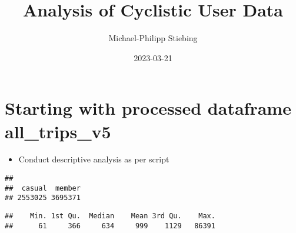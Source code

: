 \documentclass[
]{article}
\title{Analysis of Cyclistic User Data}
\author{Michael-Philipp Stiebing}
\date{2023-03-21}
\newenvironment{Shaded}{\begin{snugshade}}{\end{snugshade}}
\newcommand{\CommentTok}[1]{\textcolor[rgb]{0.56,0.35,0.01}{\textit{#1}}}
\newcommand{\FunctionTok}[1]{\textcolor[rgb]{0.00,0.00,0.00}{#1}}
\newcommand{\NormalTok}[1]{#1}
\newcommand{\OtherTok}[1]{\textcolor[rgb]{0.56,0.35,0.01}{#1}}
\newcommand{\SpecialCharTok}[1]{\textcolor[rgb]{0.00,0.00,0.00}{#1}}
\newcommand{\StringTok}[1]{\textcolor[rgb]{0.31,0.60,0.02}{#1}}
\providecommand{\tightlist}{%
  \setlength{\itemsep}{0pt}\setlength{\parskip}{0pt}}
\begin{document}
\maketitle

\fontsize{9}{11}
\selectfont

\fontsize{10}{12}
\selectfont

\hypertarget{starting-with-processed-dataframe-all_trips_v5}{%
\section{Starting with processed dataframe
all\_trips\_v5}\label{starting-with-processed-dataframe-all_trips_v5}}

\begin{itemize}
\tightlist
\item
  Conduct descriptive analysis as per script
\end{itemize}

\fontsize{9}{11}
\selectfont

\begin{Shaded}
\end{Shaded}

\begin{verbatim}
## 
##  casual  member 
## 2553025 3695371
\end{verbatim}

\begin{Shaded}
\end{Shaded}

\begin{verbatim}
##    Min. 1st Qu.  Median    Mean 3rd Qu.    Max. 
##      61     366     634     999    1129   86391
\end{verbatim}
\end{document}
